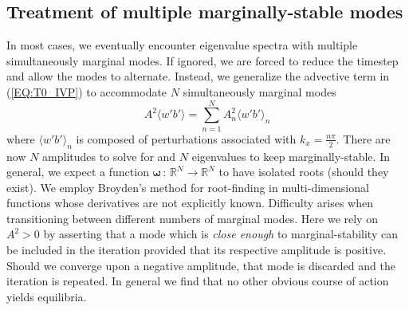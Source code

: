 \documentclass[reprint,amsmath,amssymb,aps]{revtex4-1}
\begin{document}
\subsection{Treatment of multiple marginally-stable modes} \label{sec:multiple_modes}
In most cases, we eventually encounter eigenvalue spectra with multiple simultaneously marginal modes. If ignored, we are forced to reduce the timestep and allow the modes to alternate. Instead, we generalize the advective term in (\ref{EQ:T0_IVP}) to accommodate $N$ simultaneously marginal modes
\begin{equation}
    A^2 \langle w' b' \rangle = \sum_{n = 1}^{N} A^2_{n} \langle w' b' \rangle_{n}
\end{equation}
where  $\langle w' b' \rangle_{n}$ is composed of perturbations associated with $k_x = \frac{n\pi}{2}$. There are now $N$ amplitudes to solve for and $N$ eigenvalues to keep marginally-stable. In general, we expect a function $\mathbf{\omega} \, : \, \mathbb{R}^N \to  \mathbb{R}^N$ to have isolated roots (should they exist). We employ Broyden's method for root-finding in multi-dimensional functions whose derivatives are not explicitly known. Difficulty arises when transitioning between different numbers of marginal modes. Here we rely on $A^2 > 0$ by asserting that a mode which is \textit{close enough} to marginal-stability can be included in the iteration provided that its respective amplitude is positive. Should we converge upon a negative amplitude, that mode is discarded and the iteration is repeated. In general we find that no other obvious course of action yields equilibria.
\end{document}

